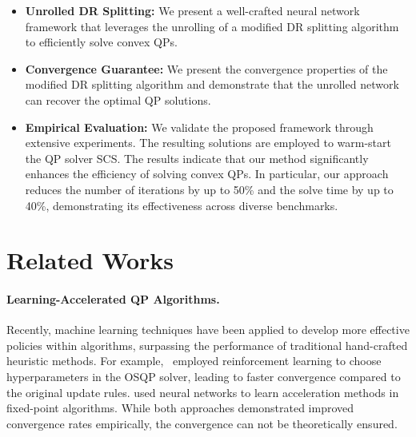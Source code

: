 \documentclass[10pt]{article} %
\begin{document}
\begin{itemize}
    \item \textbf{Unrolled DR Splitting:} We present a well-crafted neural network framework that leverages the unrolling of a modified DR splitting algorithm to efficiently solve convex QPs.
    \item \textbf{Convergence Guarantee:} We present the convergence properties of the modified DR splitting algorithm and demonstrate that the unrolled network can recover the optimal QP solutions.
    \item \textbf{Empirical Evaluation:} 
    We validate the proposed framework through extensive experiments.
    The resulting solutions are employed to warm-start the QP solver SCS.
    The results indicate that our method significantly enhances the efficiency of solving convex QPs. 
    In particular, our approach reduces the number of iterations by up to 50\% and the solve time by up to 40\%, demonstrating its effectiveness across diverse benchmarks.
\end{itemize}

\section{Related Works}
\paragraph{Learning-Accelerated QP Algorithms.}
Recently, machine learning techniques have been applied to develop more effective policies within algorithms, surpassing the performance of traditional hand-crafted heuristic methods.
For example,~\citet{ichnowski2021accelerating,jung2022learning} employed reinforcement learning to choose hyperparameters in the OSQP solver, leading to faster convergence compared to the original update rules. 
\citet{venkataraman2021neural} used neural networks to learn acceleration methods in fixed-point algorithms.
While both approaches demonstrated improved convergence rates empirically, the convergence can not be theoretically ensured.
\end{document}
